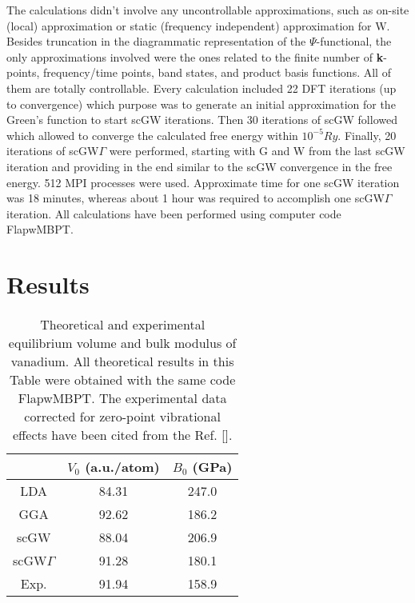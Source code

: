 \documentclass[aps,prb,floatfix,epsfig,twocolumn,preprintnumbers]{revtex4}
\begin{document}
The calculations didn't involve any uncontrollable approximations, such as on-site (local) approximation or static (frequency independent) approximation for W. Besides truncation in the diagrammatic representation of the $\Psi$-functional, the only approximations involved were the ones related to the finite number of \textbf{k}-points, frequency/time points, band states, and product basis functions. All of them are totally controllable. Every calculation included 22 DFT iterations (up to convergence) which purpose was to generate an initial approximation for the Green's function to start scGW iterations. Then 30 iterations of scGW followed which allowed to converge the calculated free energy within $10^{-5} Ry$. Finally, 20 iterations of scGW$\Gamma$ were performed, starting with G and W from the last scGW iteration and providing in the end similar to the scGW convergence in the free energy. 512 MPI processes were used. Approximate time for one scGW iteration was 18 minutes, whereas about 1 hour was required to accomplish one scGW$\Gamma$ iteration. All calculations have been performed using computer code FlapwMBPT.\cite{flapwmbpt}













\section{Results}
\label{res}



\begin{table}[b]
\caption{Theoretical and experimental equilibrium volume and bulk modulus of vanadium. All theoretical results in this Table were obtained with the same code FlapwMBPT. The experimental data corrected for zero-point vibrational effects have been cited from the Ref. [].} \label{v0b0}
\begin{center}
\begin{tabular}{@{}c c c} &$V_{0}$ (a.u./atom) &$B_{0}$ (GPa)\\
\hline \hline
LDA &84.31 &247.0\\
GGA &92.62 &186.2\\
scGW &88.04 &206.9\\
scGW$\Gamma$ &91.28 &180.1\\
Exp. &91.94 &158.9\\
\hline \hline
\end{tabular}
\end{center}
\end{table}
\end{document}
